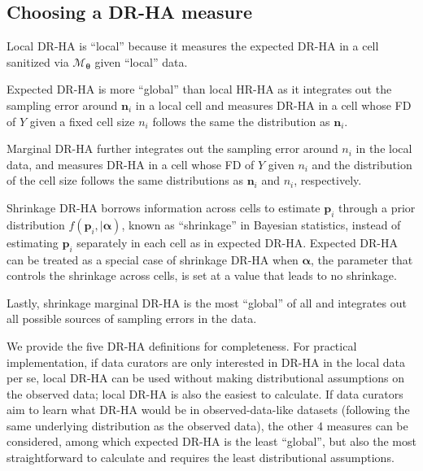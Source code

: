 \documentclass[10pt,journal,compsoc]{IEEEtran}
\newcommand{\M}{\mathcal{M}}
\newcommand{\p}{\mathbf{p}}
\newcommand{\n}{\mathbf{n}}
\newcommand{\bs}{\boldsymbol}
\begin{document}
\vspace{-12pt}\subsection{Choosing a DR-HA measure}\label{sec:choice}\vspace{-3pt}
Local DR-HA is ``local'' because it  measures the expected DR-HA in a cell sanitized  via $\M_{\bs\theta}$ given ``local'' data. 

Expected DR-HA is more ``global'' than local HR-HA as it integrates out the sampling error around $\n_i$ in a local cell   and measures DR-HA in a cell whose FD of $Y$ given a fixed cell size $n_i$ follows the same the distribution as $\n_i$.  

Marginal DR-HA further integrates out the sampling error around $n_i$ in the local data, and measures DR-HA in a cell whose FD of $Y$  given $n_i$ and the distribution of the cell size follows the same  distributions  as $\n_i$ and  $n_i$, respectively.  

Shrinkage DR-HA borrows information across cells to estimate $\p_i$  through a prior distribution $f(\p_i,|\bs{\alpha})$, known as ``shrinkage'' in Bayesian statistics, instead of estimating $\p_i$ separately in each cell as in expected DR-HA. Expected DR-HA can be treated as a special case of shrinkage DR-HA when $\bs{\alpha}$, the parameter that controls the shrinkage across cells, is set at a value that leads to no shrinkage. 

Lastly, shrinkage marginal DR-HA is the most ``global'' of all and integrates out all possible sources of sampling errors in the data.  

We provide the five DR-HA definitions for completeness. For practical implementation, if data curators are only interested in DR-HA in the local data per se, local DR-HA can be used without making distributional assumptions on the observed data; local DR-HA is also the easiest to calculate. If data curators aim to learn what DR-HA would be in observed-data-like datasets (following the same underlying distribution as the observed data), the other 4 measures can be considered, among which expected DR-HA is the least ``global'', but also the most straightforward to calculate and requires the least distributional assumptions.
\end{document}
